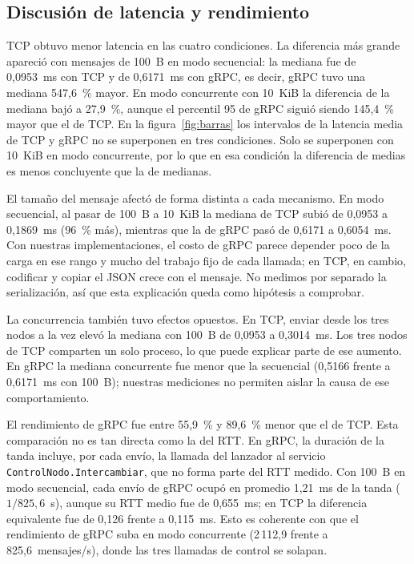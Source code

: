 \subsection{Discusión de latencia y rendimiento}

TCP obtuvo menor latencia en las cuatro condiciones. La diferencia más grande apareció con mensajes de 100~B en modo secuencial: la mediana fue de 0,0953~ms con TCP y de 0,6171~ms con gRPC, es decir, gRPC tuvo una mediana 547,6~\% mayor. En modo concurrente con 10~KiB la diferencia de la mediana bajó a 27,9~\%, aunque el percentil 95 de gRPC siguió siendo 145,4~\% mayor que el de TCP. En la figura~\ref{fig:barras} los intervalos de la latencia media de TCP y gRPC no se superponen en tres condiciones. Solo se superponen con 10~KiB en modo concurrente, por lo que en esa condición la diferencia de medias es menos concluyente que la de medianas.

El tamaño del mensaje afectó de forma distinta a cada mecanismo. En modo secuencial, al pasar de 100~B a 10~KiB la mediana de TCP subió de 0,0953 a 0,1869~ms (96~\% más), mientras que la de gRPC pasó de 0,6171 a 0,6054~ms. Con nuestras implementaciones, el costo de gRPC parece depender poco de la carga en ese rango y mucho del trabajo fijo de cada llamada; en TCP, en cambio, codificar y copiar el JSON crece con el mensaje. No medimos por separado la serialización, así que esta explicación queda como hipótesis a comprobar.

La concurrencia también tuvo efectos opuestos. En TCP, enviar desde los tres nodos a la vez elevó la mediana con 100~B de 0,0953 a 0,3014~ms. Los tres nodos de TCP comparten un solo proceso, lo que puede explicar parte de ese aumento. En gRPC la mediana concurrente fue menor que la secuencial (0,5166 frente a 0,6171~ms con 100~B); nuestras mediciones no permiten aislar la causa de ese comportamiento.

El rendimiento de gRPC fue entre 55,9~\% y 89,6~\% menor que el de TCP. Esta comparación no es tan directa como la del RTT. En gRPC, la duración de la tanda incluye, por cada envío, la llamada del lanzador al servicio \texttt{ControlNodo.Intercambiar}, que no forma parte del RTT medido. Con 100~B en modo secuencial, cada envío de gRPC ocupó en promedio 1,21~ms de la tanda ($1/825{,}6$~s), aunque su RTT medio fue de 0,655~ms; en TCP la diferencia equivalente fue de 0,126 frente a 0,115~ms. Esto es coherente con que el rendimiento de gRPC suba en modo concurrente (2\,112,9 frente a 825,6~mensajes/s), donde las tres llamadas de control se solapan.

